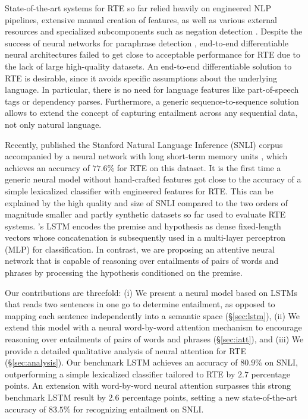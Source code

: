 \documentclass{article}
\begin{document}
State-of-the-art systems for RTE so far relied heavily on engineered NLP pipelines, extensive manual creation of features, as well as various external resources and specialized subcomponents such as negation detection \citep[e.g.][]{lai2014illinois, jimenez2014unal, zhao2014ecnu, beltagy2015representing}.
Despite the success of neural networks for paraphrase detection \citep[e.g.][]{socher2011dynamic, hu2014convolutional, yin2015convolutional}, end-to-end differentiable neural architectures failed to get close to acceptable performance for RTE due to the lack of large high-quality datasets.
An end-to-end differentiable solution to RTE is desirable, since it avoids specific assumptions about the underlying language.
In particular, there is no need for language features like part-of-speech tags or dependency parses.
Furthermore, a generic sequence-to-sequence solution allows to extend the concept of capturing entailment across any sequential data, not only natural language.

Recently, \cite{bowman2015large} published the Stanford Natural Language Inference (SNLI) corpus accompanied by a neural network with long short-term memory units \citep[LSTM,][]{hochreiter1997long}, which achieves an accuracy of $77.6\%$ for RTE on this dataset.
It is the first time a generic neural model without hand-crafted features got close to the accuracy of a simple lexicalized classifier with engineered features for RTE.
This can be explained by the high quality and size of SNLI compared to the two orders of magnitude smaller and partly synthetic datasets so far used to evaluate RTE systems.
\citeauthor{bowman2015large}'s LSTM encodes the premise and hypothesis as dense fixed-length vectors whose concatenation is subsequently used in a multi-layer perceptron (MLP) for classification.
In contrast, we are proposing an attentive neural network that is capable of reasoning over entailments of pairs of words and phrases by processing the hypothesis conditioned on the premise.

Our contributions are threefold:
(i) We present a neural model based on LSTMs that reads two sentences in one go to determine entailment, as opposed to mapping each sentence independently into a semantic space (\S\ref{sec:lstm}),
(ii) We extend this model with a neural word-by-word attention mechanism to encourage reasoning over entailments of pairs of words and phrases (\S\ref{sec:iatt}), and
(iii) We provide a detailed qualitative analysis of neural attention for RTE (\S\ref{sec:analysis}).
Our benchmark LSTM achieves an accuracy of $80.9\%$ on SNLI, outperforming a simple lexicalized classifier tailored to RTE by $2.7$ percentage points.
An extension with word-by-word neural attention surpasses this strong benchmark LSTM result by $2.6$ percentage points, setting a new state-of-the-art accuracy of $83.5\%$ for recognizing entailment on SNLI.
\end{document}
